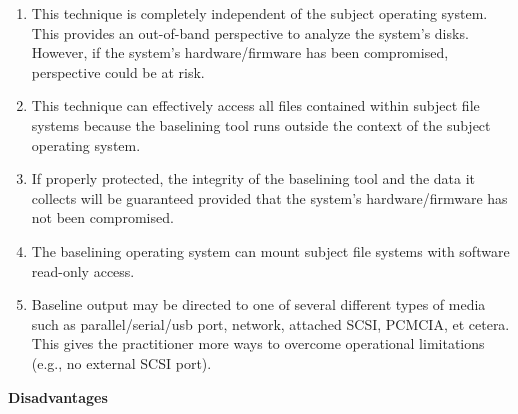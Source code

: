\documentclass[10pt]{article}
\begin{document}
\begin{enumerate}

  \item
  This technique is completely independent of the subject operating
  system.  This provides an out-of-band perspective to analyze the
  system's disks.  However, if the system's hardware/firmware has been
  compromised, perspective could be at risk.

  \item
  This technique can effectively access all files contained within
  subject file systems because the baselining tool runs outside the
  context of the subject operating system.

  \item
  If properly protected, the integrity of the baselining tool and the
  data it collects will be guaranteed provided that the system's
  hardware/firmware has not been compromised.

  \item
  The baselining operating system can mount subject file systems with
  software read-only access.

  \item
  Baseline output may be directed to one of several different types of
  media such as parallel/serial/usb port, network, attached SCSI,
  PCMCIA, et cetera.  This gives the practitioner more ways to
  overcome operational limitations (e.g., no external SCSI port).

\end{enumerate}

  \textbf{Disadvantages}
\end{document}
